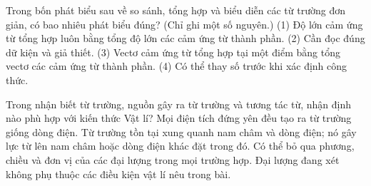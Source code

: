 \begin{ex}
Trong bốn phát biểu sau về so sánh, tổng hợp và biểu diễn các từ trường đơn giản, có bao nhiêu phát biểu đúng? (Chỉ ghi một số nguyên.) (1) Độ lớn cảm ứng từ tổng hợp luôn bằng tổng độ lớn các cảm ứng từ thành phần. (2) Cần đọc đúng dữ kiện và giả thiết. (3) Vectơ cảm ứng từ tổng hợp tại một điểm bằng tổng vectơ các cảm ứng từ thành phần. (4) Có thể thay số trước khi xác định công thức.
\end{ex}

\begin{ex}
Trong nhận biết từ trường, nguồn gây ra từ trường và tương tác từ, nhận định nào phù hợp với kiến thức Vật lí?
\choice
{Mọi điện tích đứng yên đều tạo ra từ trường giống dòng điện.}
{\True Từ trường tồn tại xung quanh nam châm và dòng điện; nó gây lực từ lên nam châm hoặc dòng điện khác đặt trong đó.}
{Có thể bỏ qua phương, chiều và đơn vị của các đại lượng trong mọi trường hợp.}
{Đại lượng đang xét không phụ thuộc các điều kiện vật lí nêu trong bài.}
\end{ex}

